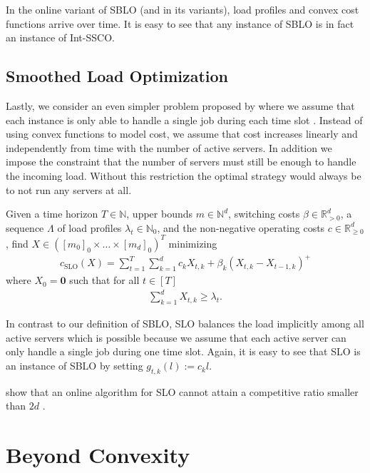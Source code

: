In the online variant of SBLO (and in its variants), load profiles and convex cost functions arrive over time. It is easy to see that any instance of SBLO is in fact an instance of Int-SSCO.

\subsection{Smoothed Load Optimization}

Lastly, we consider an even simpler problem proposed by \citeauthor*{Albers2021} where we assume that each instance is only able to handle a single job during each time slot \cite{Albers2021}. Instead of using convex functions to model cost, we assume that cost increases linearly and independently from time with the number of active servers. In addition we impose the constraint that the number of servers must still be enough to handle the incoming load. Without this restriction the optimal strategy would always be to not run any servers at all.

\begin{problem}\label{problem:sblo}
Given a time horizon $T \in \mathbb{N}$, upper bounds $m \in \mathbb{N}^d$, switching costs $\beta \in \mathbb{R}_{>0}^d$, a sequence $\Lambda$ of load profiles $\lambda_t \in \mathbb{N}_0$, and the non-negative operating costs $c \in \mathbb{R}_{\geq 0}^d$, find $X \in ([m_0]_0 \times \dots \times [m_d]_0)^T$ minimizing \begin{align*}
    c_{\text{SLO}}(X) = \sum_{t=1}^T \sum_{k=1}^d c_k X_{t,k} + \beta_k (X_{t,k} - X_{t-1,k})^+
\end{align*}
where $X_0 = \mathbf{0}$ such that for all $t \in [T]$ \begin{align*}
    \sum_{k=1}^d X_{t,k} \geq \lambda_t.
\end{align*}
\end{problem}

In contrast to our definition of SBLO, SLO balances the load implicitly among all active servers which is possible because we assume that each active server can only handle a single job during one time slot. Again, it is easy to see that SLO is an instance of SBLO by setting $g_{t,k}(l) := c_k l$.

\citeauthor*{Albers2021} show that an online algorithm for SLO cannot attain a competitive ratio smaller than $2d$ \cite{Albers2021}.

\section{Beyond Convexity}\label{section:theory:beyond_convexity}

